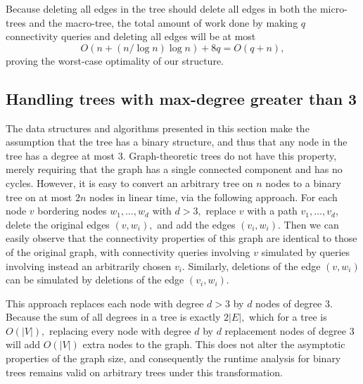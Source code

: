 \documentclass{article}
\begin{document}
Because deleting all edges in the tree should delete all edges in both the micro-trees and the macro-tree, the total amount of work done by making $q$ connectivity queries and deleting all edges will be at most $$O(n + (n/\log n)\log n) + 8q = O(q+n),$$  proving the worst-case optimality of our structure.

\subsection{Handling trees with max-degree greater than 3}
The data structures and algorithms presented in this section make the assumption that the tree has a binary structure, and thus that any node in the tree has a degree at most 3. Graph-theoretic trees do not have this property, merely requiring that the graph has a single connected component and has no cycles. However, it is easy to convert an arbitrary tree on $n$ nodes to a binary tree on at most $2n$ nodes in linear time, via the following approach. For each node $v$ bordering nodes $w_1,\ldots, w_d$ with $d>3,$ replace $v$ with a path $v_1,\ldots,v_d$, delete the original edges $(v,w_i),$ and add the edges $(v_i,w_i).$ Then we can easily observe that the connectivity properties of this graph are identical to those of the original graph, with connectivity queries involving $v$ simulated by queries involving instead an arbitrarily chosen $v_i.$ Similarly, deletions of the edge $(v,w_i)$ can be simulated by deletions of the edge $(v_i,w_i).$

This approach replaces each node with degree $d>3$ by $d$ nodes of degree 3. Because the sum of all degrees in a tree is exactly $2|E|,$ which for a tree is $O(|V|),$ replacing every node with degree $d$ by $d$ replacement nodes of degree 3 will add $O(|V|)$ extra nodes to the graph. This does not alter the asymptotic properties of the graph size, and consequently the runtime analysis for binary trees remains valid on arbitrary trees under this transformation.
\end{document}
